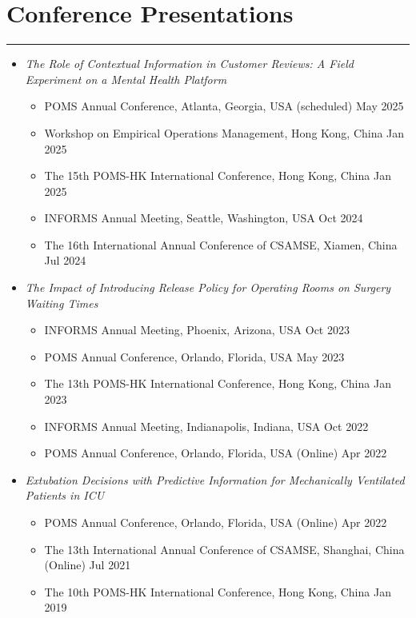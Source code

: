 \documentclass[12pt, a4paper]{article}
\begin{document}
{%

\section*{Conference Presentations}
\vspace*{4pt}
\hrule

\begin{itemize}[leftmargin=14pt]

	\item[] {\it The Role of Contextual Information in Customer Reviews: A Field Experiment on a Mental Health Platform}
	\begin{itemize}[label=$\bullet$]
		\item POMS Annual Conference, Atlanta, Georgia, USA (scheduled) \hfill May 2025
		\item Workshop on Empirical Operations Management, Hong Kong, China \hfill Jan 2025
		\item The 15th POMS-HK International Conference, Hong Kong, China \hfill Jan 2025
		\item INFORMS Annual Meeting, Seattle, Washington, USA \hfill Oct 2024
		\item The 16th International Annual Conference of CSAMSE, Xiamen, China \hfill Jul 2024
	\end{itemize}

	\item[] {\it The Impact of Introducing Release Policy for Operating Rooms on Surgery Waiting Times}
	\begin{itemize}[label=$\bullet$]
		\item INFORMS Annual Meeting, Phoenix, Arizona, USA \hfill Oct 2023
		\item POMS Annual Conference, Orlando, Florida, USA \hfill May 2023
		\item The 13th POMS-HK International Conference, Hong Kong, China \hfill Jan 2023
		\item INFORMS Annual Meeting, Indianapolis, Indiana, USA \hfill Oct 2022
		\item POMS Annual Conference, Orlando, Florida, USA (Online) \hfill Apr 2022
	\end{itemize}

	\item[] {\it Extubation Decisions with Predictive Information for Mechanically Ventilated Patients in ICU}
	\begin{itemize}[label=$\bullet$]
		\item POMS Annual Conference, Orlando, Florida, USA (Online) \hfill Apr 2022
		\item The 13th International Annual Conference of CSAMSE, Shanghai, China (Online) \hfill Jul 2021
		\item The 10th POMS-HK International Conference, Hong Kong, China \hfill Jan 2019
	\end{itemize}


\end{itemize}}
\end{document}
